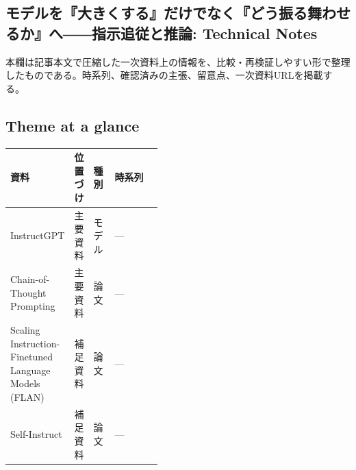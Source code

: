 \subsection*{モデルを『大きくする』だけでなく『どう振る舞わせるか』へ――指示追従と推論: Technical Notes}
本欄は記事本文で圧縮した一次資料上の情報を、比較・再検証しやすい形で整理したものである。時系列、確認済みの主張、留意点、一次資料URLを掲載する。
\smallskip
{}\par
\medskip
\subsection*{Theme at a glance}
\begin{center}
\footnotesize
\begin{tabularx}{\linewidth}{@{}p{0.20\linewidth}p{0.10\linewidth}p{0.14\linewidth}X@{}}
\toprule
資料 & 位置づけ & 種別 & 時系列 \\
\midrule
InstructGPT & 主要資料 & モデル & — \\
Chain-of-Thought Prompting & 主要資料 & 論文 & — \\
Scaling Instruction-Finetuned Language Models (FLAN) & 補足資料 & 論文 & — \\
Self-Instruct & 補足資料 & 論文 & — \\
\bottomrule
\end{tabularx}
\end{center}
\normalsize

